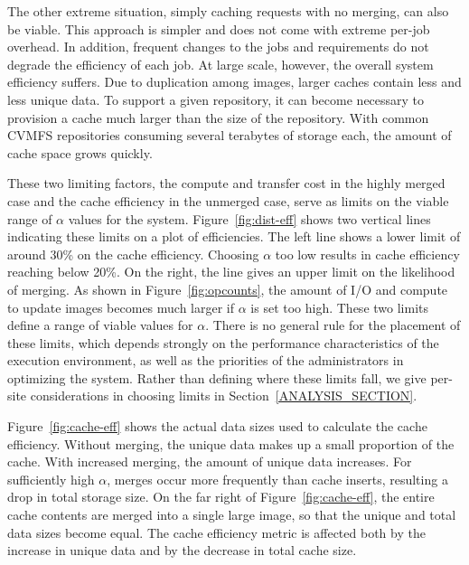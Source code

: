 \documentclass[sigconf]{acmart}
\begin{document}
The other extreme situation,
simply caching requests with no merging,
can also be viable.
This approach is simpler and does not come with extreme per-job overhead.
In addition, frequent changes to the jobs and requirements do not degrade the efficiency of each job.
At large scale, however,
the overall system efficiency suffers.
Due to duplication among images,
larger caches contain less and less unique data.
To support a given repository,
it can become necessary to provision a cache much larger than the size of the repository.
With common CVMFS repositories consuming several terabytes of storage each,
the amount of cache space grows quickly.

These two limiting factors,
the compute and transfer cost in the highly merged case and the cache efficiency in the unmerged case,
serve as limits on the viable range of $\alpha$ values for the system.
Figure~\ref{fig:dist-eff} shows two vertical lines indicating these limits on a plot of efficiencies.
The left line shows a lower limit of around 30\% on the cache efficiency.
Choosing $\alpha$ too low results in cache efficiency reaching below 20\%.
On the right, the line gives an upper limit on the likelihood of merging.
As shown in Figure~\ref{fig:opcounts},
the amount of I/O and compute to update images becomes much larger if $\alpha$ is set too high.
These two limits define a range of viable values for $\alpha$.
There is no general rule for the placement of these limits,
which depends strongly on the performance characteristics of the execution environment,
as well as the priorities of the administrators in optimizing the system.
Rather than defining where these limits fall,
we give per-site considerations in choosing limits in Section~\ref{ANALYSIS_SECTION}.

Figure~\ref{fig:cache-eff} shows the actual data sizes used to calculate the cache efficiency.
Without merging, the unique data makes up a small proportion of the cache.
With increased merging, the amount of unique data increases.
For sufficiently high $\alpha$,
merges occur more frequently than cache inserts,
resulting a drop in total storage size.
On the far right of Figure~\ref{fig:cache-eff},
the entire cache contents are merged into a single large image,
so that the unique and total data sizes become equal.
The cache efficiency metric is affected both by the increase in unique data and by the decrease in total cache size.
\end{document}
